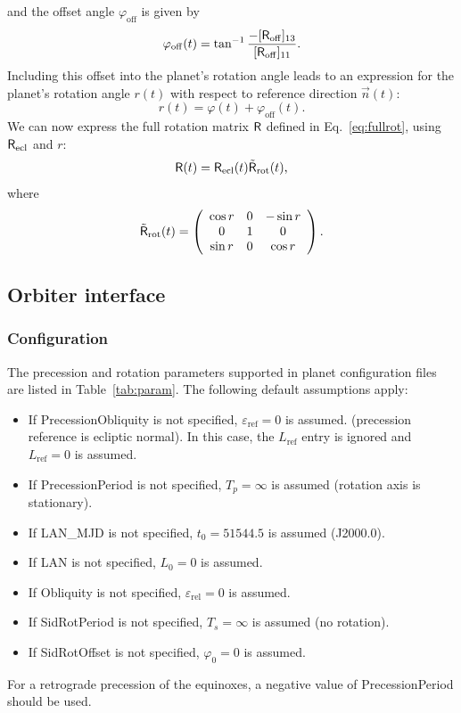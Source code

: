 \documentclass[Orbiter Technical Reference.tex]{subfiles}
\begin{document}
and the offset angle $\varphi_\mathrm{off}$ is given by
\begin{equation}
\varphi_\mathrm{off}(t) = \tan^{-1} \frac{-[\mathsf{R}_\mathrm{off}]_{13}}{[\mathsf{R}_\mathrm{off}]_{11}}.
\end{equation}
Including this offset into the planet's rotation angle leads to an expression for the planet's rotation angle $r(t)$ with respect to reference direction $\vec{n}(t)$:
\begin{equation}\label{eq:rotangle}
r(t) = \varphi(t) + \varphi_\mathrm{off}(t).
\end{equation}
We can now express the full rotation matrix $\mathsf{R}$ defined in Eq.~\ref{eq:fullrot}, using $\mathsf{R}_\mathrm{ecl}$ and $r$:
\begin{equation}
\mathsf{R}(t) = \mathsf{R}_\mathrm{ecl}(t) \tilde{\mathsf{R}}_\mathrm{rot}(t),
\end{equation}
where
\begin{equation}
\tilde{\mathsf{R}}_\mathrm{rot}(t) = \left( \begin{array}{ccc}
\cos r & 0 & -\sin r \\
0 & 1 & 0 \\
\sin r & 0 & \cos r
\end{array} \right).
\end{equation}

\subsection{Orbiter interface}
\subsubsection{Configuration}
The precession and rotation parameters supported in planet configuration files are listed in Table~\ref{tab:param}.
The following default assumptions apply:
\begin{itemize}
\item If PrecessionObliquity is not specified, $\varepsilon_\mathrm{ref}=0$ is assumed. (precession reference is ecliptic normal). In this case, the $L_\mathrm{ref}$ entry is ignored and $L_\mathrm{ref}=0$ is assumed.
\item If PrecessionPeriod is not specified, $T_p = \infty$ is assumed (rotation axis is stationary).
\item If LAN\_MJD is not specified, $t_0 = 51544.5$ is assumed (J2000.0).
\item If LAN is not specified, $L_0=0$ is assumed.
\item If Obliquity is not specified, $\varepsilon_\mathrm{rel}=0$ is assumed.
\item If SidRotPeriod is not specified, $T_s=\infty$ is assumed (no rotation).
\item If SidRotOffset is not specified, $\varphi_0=0$ is assumed.
\end{itemize}
For a retrograde precession of the equinoxes, a negative value of PrecessionPeriod should be used.
\end{document}
